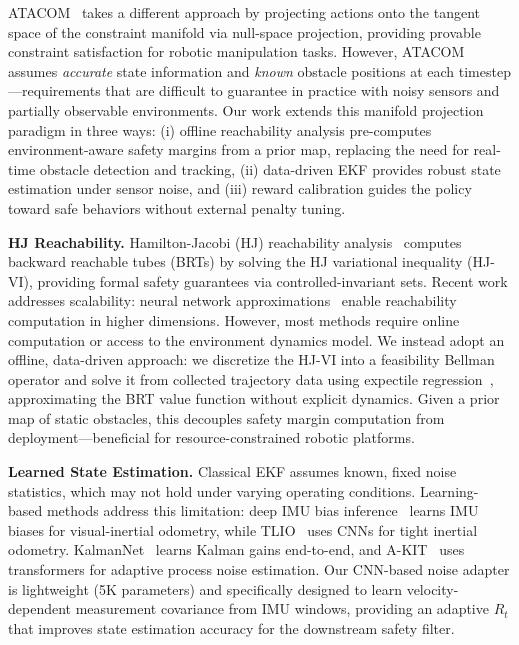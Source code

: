 \documentclass[letterpaper, 10 pt, conference]{ieeeconf}
\begin{document}
ATACOM~\cite{liu2022atacom, liu2023safe_manipulation} takes a different approach by projecting actions onto the tangent space of the constraint manifold via null-space projection, providing provable constraint satisfaction for robotic manipulation tasks. However, ATACOM assumes \emph{accurate} state information and \emph{known} obstacle positions at each timestep---requirements that are difficult to guarantee in practice with noisy sensors and partially observable environments. Our work extends this manifold projection paradigm in three ways: (i) offline reachability analysis pre-computes environment-aware safety margins from a prior map, replacing the need for real-time obstacle detection and tracking, (ii) data-driven EKF provides robust state estimation under sensor noise, and (iii) reward calibration guides the policy toward safe behaviors without external penalty tuning.

\textbf{HJ Reachability.} Hamilton-Jacobi (HJ) reachability analysis~\cite{bansal2017hj_reachability} computes backward reachable tubes (BRTs) by solving the HJ variational inequality (HJ-VI), providing formal safety guarantees via controlled-invariant sets. Recent work addresses scalability: neural network approximations~\cite{hsu2021safety, so2023rtreach} enable reachability computation in higher dimensions. However, most methods require online computation or access to the environment dynamics model. We instead adopt an offline, data-driven approach: we discretize the HJ-VI into a feasibility Bellman operator and solve it from collected trajectory data using expectile regression~\cite{kostrikov2022iql}, approximating the BRT value function without explicit dynamics. Given a prior map of static obstacles, this decouples safety margin computation from deployment---beneficial for resource-constrained robotic platforms.

\textbf{Learned State Estimation.} Classical EKF assumes known, fixed noise statistics, which may not hold under varying operating conditions. Learning-based methods address this limitation: deep IMU bias inference~\cite{buchanan2022learning_ekf} learns IMU biases for visual-inertial odometry, while TLIO~\cite{liu2023denoise_imu} uses CNNs for tight inertial odometry. KalmanNet~\cite{revach2022kalmannet} learns Kalman gains end-to-end, and A-KIT~\cite{levy2024akit} uses transformers for adaptive process noise estimation. Our CNN-based noise adapter is lightweight (5K parameters) and specifically designed to learn velocity-dependent measurement covariance from IMU windows, providing an adaptive $R_t$ that improves state estimation accuracy for the downstream safety filter.
\end{document}
